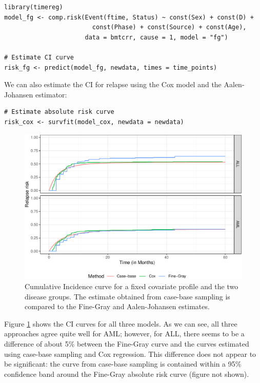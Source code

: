 \begin{verbatim}
library(timereg)
model_fg <- comp.risk(Event(ftime, Status) ~ const(Sex) + const(D) +
                        const(Phase) + const(Source) + const(Age),
                      data = bmtcrr, cause = 1, model = "fg")

# Estimate CI curve
risk_fg <- predict(model_fg, newdata, times = time_points)
\end{verbatim}

We can also estimate the CI for relapse using the Cox model and the Aalen-Johansen estimator:

\begin{verbatim}
# Estimate absolute risk curve
risk_cox <- survfit(model_cox, newdata = newdata)
\end{verbatim}

\begin{figure}[ht]
\includegraphics[width=\textwidth,keepaspectratio=true]{./compAbsrisk-1} \caption{Cumulative Incidence curve for a fixed covariate profile and the two disease groups. The estimate obtained from case-base sampling is compared to the Fine-Gray and Aalen-Johansen estimates.}\label{fig:compAbsrisk}
\end{figure}

Figure \ref{fig:compAbsrisk} shows the CI curves for all three models. As we can see, all three approaches agree quite well for AML; however, for ALL, there seems to be a difference of about 5\% between the Fine-Gray curve and the curves estimated using case-base sampling and Cox regression. This difference does not appear to be significant: the curve from case-base sampling is contained within a 95\% confidence band around the Fine-Gray absolute risk curve (figure not shown).

